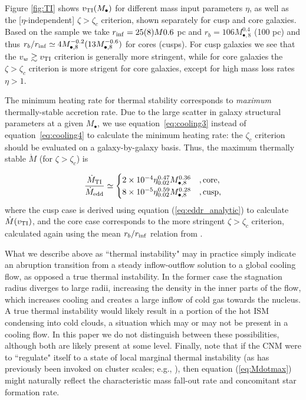 \documentclass[usenatbib,fleqn]{mn2e}
\newcommand{\Mdot}{\dot{M}}
\newcommand{\rb}{r_b}
\newcommand{\Mbh}[1][]{M_{\bullet#1}}
\newcommand{\Mbheight}{M_{\bullet,8}}
\newcommand{\rinf}{r_{\rm inf}}
\begin{document}
Figure \ref{fig:TI} shows $v_{\rm TI}(M_{\bullet})$ for different mass
input parameters $\eta$, as well as the [$\eta$-independent] $\zeta >
\zeta_c$ criterion, shown separately for cusp and core galaxies.
Based on the \citet{LauerFaber+:2007a} sample we take $\rinf = 25(8)M
0.6$ pc and $\rb = 106 \Mbheight^{0.4}$ (100 pc) and thus
$\rb/\rinf\simeq 4 \Mbheight^{-0.2} (13 \Mbheight^{-0.6})$ for cores
(cusps).  For cusp galaxies we see that the $v_w \gtrsim v_{\rm TI}$
criterion is generally more stringent, while for core galaxies the
$\zeta > \zeta_c$ criterion is more strigent for core galaxies, except
for high mass loss rates $\eta > 1$.

The minimum heating rate for thermal stability corresponds to {\it
  maximum} thermally-stable accretion rate. Due to the large scatter
in galaxy structural parameters at a given $\Mbh$, we use
equation~\eqref{eq:cooling3} instead of equation~\eqref{eq:cooling4}
to calculate the minimum heating rate: the $\zeta_c$ criterion should
be evaluated on a galaxy-by-galaxy basis. Thus, the maximum thermally
stable $\Mdot$ (for $\zeta>\zeta_c$) is

\begin{align}
  \frac{\dot{M}_{\rm TI}}{\dot{M}_{\rm edd}} \simeq \begin{cases}
    2\times 10^{-4}\eta_{0.02}^{0.47}M_{\bullet,8}^{0.36} &, \text{core}, \\
    8\times 10^{-5} \eta_{0.02}^{0.59} M_{\bullet,8}^{0.28}    &, \text{cusp},\\
  \end{cases}
  \label{eq:Mdotmax}
\end{align}
where the cusp case is derived using equation (\ref{eq:eddr_analytic})
to calculate $\dot{M}(v_{\rm TI})$, and the core case corresponds to
the more stringent $\zeta > \zeta_c$ criterion, calculated again using
the mean $r_{b}/r_{\rm inf}$ relation from \citet{LauerFaber+:2007a}.

What we describe above as ``thermal instability" may in practice
simply indicate an abruption transition from a steady inflow-outflow
solution to a global cooling flow, as opposed a true thermal
instability.  In the former case the stagnation radius diverges to
large radii, increasing the density in the inner parts of the flow,
which increases cooling and creates a large inflow of cold gas towards
the nucleus.  A true thermal instability would likely result in a
portion of the hot ISM condensing into cold clouds, a situation which
may or may not be present in a cooling flow.  In this paper we do not
distinguish between these possibilities, although both are likely
present at some level.  Finally, note that if the CNM were to
``regulate" itself to a state of local marginal thermal instability
(as has previously been invoked on cluster scales; e.g.,
\citealt{Voit+15}), then equation (\ref{eq:Mdotmax}) might naturally
reflect the characteristic mass fall-out rate and concomitant star
formation rate.
\end{document}
